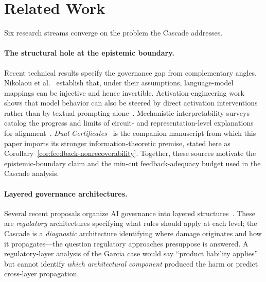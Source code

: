 \section{Related Work}\label{sec:related}

Six research streams converge on the problem the Cascade addresses.

\paragraph{The structural hole at the epistemic boundary.} Recent technical results specify the governance gap from complementary angles. Nikolaou et al.~\cite{nikolaou2025injective} establish that, under their assumptions, language-model mappings can be injective and hence invertible. Activation-engineering work shows that model behavior can also be steered by direct activation interventions rather than by textual prompting alone~\cite{turner2024steering}. Mechanistic-interpretability surveys catalog the progress and limits of circuit- and representation-level explanations for alignment~\cite{naseem2026mechanistic}. \textit{Dual Certificates}~\cite{anon2026dual} is the companion manuscript from which this paper imports its stronger information-theoretic premise, stated here as Corollary~\ref{cor:feedback-nonrecoverability}. Together, these sources motivate the epistemic-boundary claim and the min-cut feedback-adequacy budget used in the Cascade analysis.

\paragraph{Layered governance architectures.} Several recent proposals organize AI governance into layered structures~\cite{bommarito2025governing}. These are \textit{regulatory} architectures specifying what rules should apply at each level; the Cascade is a \textit{diagnostic} architecture identifying where damage originates and how it propagates---the question regulatory approaches presuppose is answered. A regulatory-layer analysis of the Garcia case would say ``product liability applies'' but cannot identify \textit{which architectural component} produced the harm or predict cross-layer propagation.

